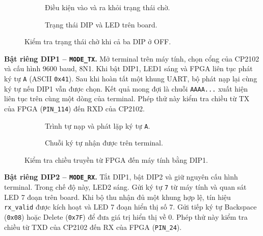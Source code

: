 \begin{figure}[H]
    \centering
    \begin{subfigure}[b]{0.47\linewidth}
        \centering
        \caption{Điều kiện vào và ra khỏi trạng thái chờ.}
        \label{fig:mode_idle_fsm}
    \end{subfigure}
    \hfill
    \begin{subfigure}[b]{0.47\linewidth}
        \centering
        \caption{Trạng thái DIP và LED trên board.}
        \label{fig:mode_idle_evidence}
    \end{subfigure}
    \caption{Kiểm tra trạng thái chờ khi cả ba DIP ở OFF.}
    \label{fig:mode_idle}
\end{figure}

\noindent\textbf{Bật riêng DIP1 -- \texttt{MODE\_TX}.}
Mở terminal trên máy tính, chọn cổng của CP2102 và cấu hình
9600 baud, 8N1. Khi bật DIP1, LED1 sáng và FPGA liên tục phát
ký tự \texttt{A} (ASCII \texttt{0x41}). Sau khi hoàn tất một
khung UART, bộ phát nạp lại cùng ký tự nếu DIP1 vẫn được chọn.
Kết quả mong đợi là chuỗi \texttt{AAAA...} xuất hiện liên tục
trên cùng một dòng của terminal. Phép thử này kiểm tra chiều
từ TX của FPGA (\texttt{PIN\_114}) đến RXD của CP2102.

\begin{figure}[H]
    \centering
    \begin{subfigure}[b]{0.47\linewidth}
        \centering
        \caption{Trình tự nạp và phát lặp ký tự \texttt{A}.}
        \label{fig:mode_tx_fsm}
    \end{subfigure}
    \hfill
    \begin{subfigure}[b]{0.47\linewidth}
        \centering
        \caption{Chuỗi ký tự nhận được trên terminal.}
        \label{fig:mode_tx_evidence}
    \end{subfigure}
    \caption{Kiểm tra chiều truyền từ FPGA đến máy tính bằng DIP1.}
    \label{fig:mode_tx}
\end{figure}

\noindent\textbf{Bật riêng DIP2 -- \texttt{MODE\_RX}.}
Tắt DIP1, bật DIP2 và giữ nguyên cấu hình terminal. Trong chế độ
này, LED2 sáng. Gửi ký tự \texttt{7} từ máy tính và quan sát LED
7 đoạn trên board. Khi bộ thu nhận đủ một khung hợp lệ, tín hiệu
\texttt{rx\_valid} được kích hoạt và LED 7 đoạn hiển thị số 7.
Gửi tiếp ký tự Backspace (\texttt{0x08}) hoặc Delete
(\texttt{0x7F}) để đưa giá trị hiển thị về 0. Phép thử này kiểm
tra chiều từ TXD của CP2102 đến RX của FPGA (\texttt{PIN\_24}).

